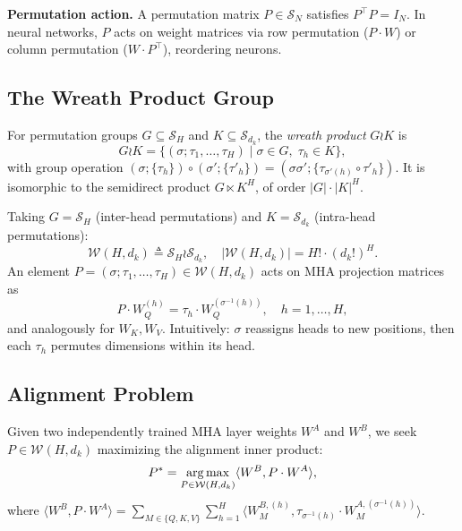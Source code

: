 \medskip\noindent\textbf{Permutation action.} A permutation matrix $P \in \mathcal{S}_N$ satisfies $P^\top P = I_N$. In neural networks, $P$ acts on weight matrices via row permutation ($P \cdot W$) or column permutation ($W \cdot P^\top$), reordering neurons.

\subsection{The Wreath Product Group}

\begin{definition}\label{def:wreath}
For permutation groups $G \subseteq \mathcal{S}_H$ and $K \subseteq \mathcal{S}_{d_k}$, the \emph{wreath product} $G \wr K$ is
\begin{equation}
    G \wr K = \{ (\sigma; \tau_1, \ldots, \tau_H) \mid \sigma \in G,\; \tau_h \in K \},
\end{equation}
with group operation $(\sigma; \{\tau_h\}) \circ (\sigma'; \{\tau'_h\}) = (\sigma\sigma'; \{\tau_{\sigma'(h)} \circ \tau'_h\})$. It is isomorphic to the semidirect product $G \ltimes K^H$, of order $|G| \cdot |K|^H$.
\end{definition}

Taking $G = \mathcal{S}_H$ (inter-head permutations) and $K = \mathcal{S}_{d_k}$ (intra-head permutations):
\begin{equation}
    \boxed{\mathcal{W}(H, d_k) \triangleq \mathcal{S}_H \wr \mathcal{S}_{d_k},\quad |\mathcal{W}(H, d_k)| = H! \cdot (d_k!)^H}.
\end{equation}
An element $P = (\sigma; \tau_1, \ldots, \tau_H) \in \mathcal{W}(H, d_k)$ acts on MHA projection matrices as
\begin{equation}\label{eq:wreath-action}
    P \cdot W_Q^{(h)} = \tau_h \cdot W_Q^{(\sigma^{-1}(h))},\quad h = 1, \ldots, H,
\end{equation}
and analogously for $W_K, W_V$. Intuitively: $\sigma$ reassigns heads to new positions, then each $\tau_h$ permutes dimensions within its head.

\subsection{Alignment Problem}

Given two independently trained MHA layer weights $W^A$ and $W^B$, we seek $P \in \mathcal{W}(H, d_k)$ maximizing the alignment inner product:
\begin{equation}\label{eq:alignment-single}
    P^* = \operatorname*{arg\,max}_{P \in \mathcal{W}(H, d_k)} \langle W^B, P \cdot W^A \rangle,
\end{equation}
where $\langle W^B, P \cdot W^A \rangle = \sum_{M \in \{Q,K,V\}} \sum_{h=1}^{H} \langle W_M^{B,(h)}, \tau_{\sigma^{-1}(h)} \cdot W_M^{A,(\sigma^{-1}(h))} \rangle$.


